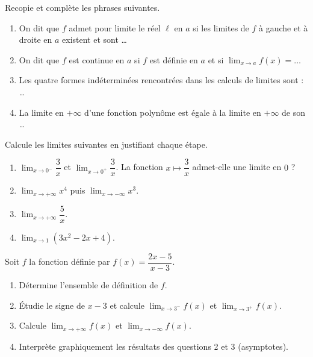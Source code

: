 \documentclass[11pt]{article}
\newcommand{\cle}[1]{{\popxbold\color{popdark}#1}}
\newcounter{popsec}
\newcounter{popsub}
\newcommand{\courssub}[1]{%
  \stepcounter{popsub}%
  \par\vspace{9pt}\noindent{\popxbold\fontsize{11.5}{13}\selectfont\color{popink}{\color{poporange}\thepopsec.\thepopsub}\hspace{6pt}#1}\par\nopagebreak\vspace{4pt}
}
\begin{document}
\begin{exercice}
Recopie et complète les phrases suivantes.
\begin{enumerate}
\item On dit que $f$ admet pour limite le réel $\ell$ en $a$ si les limites de $f$ à \cle{gauche} et à \cle{droite} en $a$ existent et sont \ldots
\item On dit que $f$ est \cle{continue} en $a$ si $f$ est définie en $a$ et si $\displaystyle\lim_{x\to a}f(x)=\ldots$
\item Les quatre formes indéterminées rencontrées dans les calculs de limites sont : \ldots
\item La limite en $+\infty$ d'une fonction polynôme est égale à la limite en $+\infty$ de son \ldots
\end{enumerate}
\end{exercice}

\begin{exercice}
Calcule les limites suivantes en justifiant chaque étape.
\begin{enumerate}
\item $\displaystyle\lim_{x\to 0^-}\dfrac{3}{x}$ et $\displaystyle\lim_{x\to 0^+}\dfrac{3}{x}$. La fonction $x\mapsto\dfrac{3}{x}$ admet-elle une limite en $0$ ?
\item $\displaystyle\lim_{x\to+\infty}x^4$ puis $\displaystyle\lim_{x\to-\infty}x^3$.
\item $\displaystyle\lim_{x\to+\infty}\dfrac{5}{x}$.
\item $\displaystyle\lim_{x\to 1}\left(3x^2-2x+4\right)$.
\end{enumerate}
\end{exercice}

\courssub{Je m'entraîne}

\begin{exercice}
Soit $f$ la fonction définie par $f(x)=\dfrac{2x-5}{x-3}$.
\begin{enumerate}
\item Détermine l'ensemble de définition de $f$.
\item Étudie le signe de $x-3$ et calcule $\displaystyle\lim_{x\to 3^-}f(x)$ et $\displaystyle\lim_{x\to 3^+}f(x)$.
\item Calcule $\displaystyle\lim_{x\to+\infty}f(x)$ et $\displaystyle\lim_{x\to-\infty}f(x)$.
\item Interprète graphiquement les résultats des questions 2 et 3 (asymptotes).
\end{enumerate}
\end{exercice}
\end{document}
